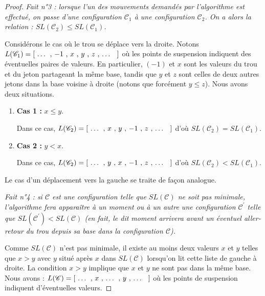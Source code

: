 \begin{proof}
	\textit{Fait n°3 : lorsque l'un des mouvements demandés par l'algorithme est effectué, on passe d'une configuration $\mathscr{C}_1$ à une configuration $\mathscr{C}_2$. On a alors la relation : $SL(\mathscr{C}_2) \leqslant SL(\mathscr{C}_1)$.}


	\medskip

	Considérons le cas où le trou se déplace vers la droite. 
	Notons $L(\mathscr{C}_1) = [ \text{\ \dots{} , $-1$ , $x$ , $y$ , $z$ , \dots{} \ } ]$ où les points de suspension indiquent des éventuelles paires de valeurs.
	En particulier, $(-1)$ et $x$ sont les valeurs du trou et du jeton partageant la même base, tandis que $y$ et $z$ sont celles de deux autres jetons dans la base voisine à droite (notons que forcément $y \leqslant z$). Nous avons deux situations.

	\begin{enumerate}
		\item \textbf{Cas 1 :} $x \leqslant y$.
		
		Dans ce cas, $L(\mathscr{C}_2) = [ \text{\ \dots{} , $x$ , $y$ , $-1$ , $z$ , \dots{} \ } ]$ d'où $SL(\mathscr{C}_2) = SL(\mathscr{C}_1)$.
	
		\item \textbf{Cas 2 :} $y < x$.
		
		Dans ce cas, $L(\mathscr{C}_2) = [ \text{\ \dots{} , $y$ , $x$ , $-1$ , $z$ , \dots{} \ } ]$ d'où $SL(\mathscr{C}_2) < SL(\mathscr{C}_1)$.
		\end{enumerate}

	Le cas d'un déplacement vers la gauche se traite de façon analogue.
	
	
	\medskip

	\textit{Fait n°4 : si $\mathscr{C}$ est une configuration telle que $SL(\mathscr{C})$ ne soit pas minimale, l'algorithme fera apparaître à un moment ou à un autre une configuration $\mathscr{C}^\prime$ telle que $SL(\mathscr{C}^\prime) < SL(\mathscr{C})$ (en fait, le dit moment arrivera avant un éventuel aller-retour  du trou depuis sa base dans la configuration $\mathscr{C}$).}


	\medskip

	Comme $SL(\mathscr{C})$ n'est pas minimale, il existe au moins deux valeurs $x$ et $y$ telles que $x > y$ avec $y$ situé après $x$ dans $SL(\mathscr{C})$ lorsqu'on lit cette liste de gauche à droite. 
	La condition $x > y$ implique que $x$ et $y$ ne sont pas dans la même base. Nous avons : $L(\mathscr{C}) = [ \text{\ \dots{} , $x$ , \dots{} , $y$ , \dots{} \ } ]$ où les points de suspension indiquent d'éventuelles valeurs.



\end{proof}
